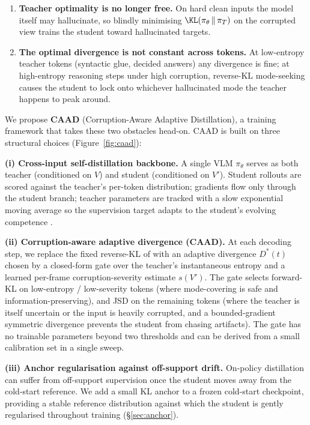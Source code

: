 \documentclass{article}
\newcommand{\teacher}{\pi_T}
\newcommand{\student}{\pi_\theta}
\newcommand{\caad}{\textsc{CAAD}}
\begin{document}
\begin{enumerate}[leftmargin=*,nosep]
\item \textbf{Teacher optimality is no longer free.} On hard clean inputs the model itself may hallucinate, so blindly minimising $\KL(\student \,\|\, \teacher)$ on the corrupted view trains the student toward hallucinated targets.
\item \textbf{The optimal divergence is not constant across tokens.} At low-entropy teacher tokens (syntactic glue, decided answers) any divergence is fine; at high-entropy reasoning steps under high corruption, reverse-KL mode-seeking causes the student to lock onto whichever hallucinated mode the teacher happens to peak around.
\end{enumerate}

We propose \textbf{\caad{}} (Corruption-Aware Adaptive Distillation), a training framework that takes these two obstacles head-on. \caad{} is built on three structural choices (Figure~\ref{fig:caad}):

\textbf{(i) Cross-input self-distillation backbone.} A single VLM $\student$ serves as both teacher (conditioned on $V$) and student (conditioned on $V'$). Student rollouts are scored against the teacher's per-token distribution; gradients flow only through the student branch; teacher parameters are tracked with a slow exponential moving average so the supervision target adapts to the student's evolving competence \citep{tarvainen2017mean}.

\textbf{(ii) Corruption-aware adaptive divergence (CAAD).} At each decoding step, we replace the fixed reverse-KL of \citet{shenfeld2026sdft} with an adaptive divergence $D^*(t)$ chosen by a closed-form gate over the teacher's instantaneous entropy and a learned per-frame corruption-severity estimate $s(V')$. The gate selects forward-KL on low-entropy / low-severity tokens (where mode-covering is safe and information-preserving), and JSD on the remaining tokens (where the teacher is itself uncertain or the input is heavily corrupted, and a bounded-gradient symmetric divergence prevents the student from chasing artifacts). The gate has no trainable parameters beyond two thresholds and can be derived from a small calibration set in a single sweep.

\textbf{(iii) Anchor regularisation against off-support drift.} On-policy distillation can suffer from off-support supervision once the student moves away from the cold-start reference. We add a small KL anchor to a frozen cold-start checkpoint, providing a stable reference distribution against which the student is gently regularised throughout training (\S\ref{sec:anchor}).
\end{document}
